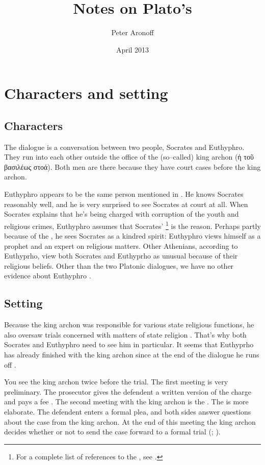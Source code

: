 \documentclass[10pt]{article}
\begin{document}
\begin{titlepage}
\title{Notes on Plato's }
\author{Peter Aronoff}
\date{April 2013}
\maketitle
\end{titlepage}

\section{Characters and setting}

\subsection{Characters}

The dialogue is a conversation between two people, Socrates and Euthyphro.
They run into each other outside the office of the (so--called) king archon
(ἡ τοῦ βασιλέως στοά).  Both men are there because they have court cases
before the king archon.

Euthyphro appears to be the same person mentioned in 
\citep[85]{burnet1924}.  He knows Socrates reasonably well, and he is very
surprised to see Socrates at court at all.  When Socrates explains that
he's being charged with corruption of the youth and religious crimes,
Euthyphro assumes that Socrates' \footnote{For
a complete list of references to the , see \citealp[page
32]{bailly2003}.} is the reason.  Perhaps partly because of the
, he sees Socrates as a kindred spirit: Euthyphro views
himself as a prophet and an expert on religious matters.  Other Athenians,
according to Euthyprho, view both Socrates and Euthyprho as unusual because
of their religious beliefs.  Other than the two Platonic dialogues, we have
no other evidence about Euthyphro \cite[16]{bailly2003}.

\subsection{Setting}

Because the king archon was responsible for various state religious
functions, he also oversaw trials concerned with matters of state religion
\citep[82--83]{burnet1924}.  That's why both Socrates and Euthyphro need to
see him in particular.  It seems that Euthyprho has already finished with
the king archon since at the end of the dialogue he runs off
\citep[82]{burnet1924}.

You see the king archon twice before the trial. The first meeting is very
preliminary. The prosecutor gives the defendent a written version of the
charge and pays a fee \citep[7--8]{brickhouse2004}. The second meeting with
the king archon is the . The  is more
elaborate. The defendent enters a formal plea, and both sides answer
questions about the case from the king archon.  At the end of this meeting
the king archon decides whether or not to send the case forward to a formal
trial (\citealp[82--83]{burnet1924}; \citealp[8]{brickhouse2004}).



\end{document}
